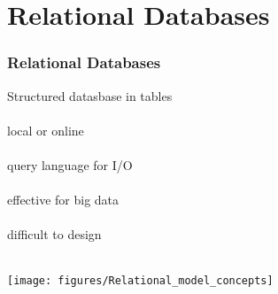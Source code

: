 \documentclass{beamer}
\begin{document}

\section{Relational Databases}

\begin{frame}
	\frametitle{Relational Databases}
	\begin{center}
		Structured datasbase in tables \\~\\
		local or online \\~\\
		query language for I/O \\~\\
		effective for big data \\~\\
		difficult to design \\~\\
	\end{center}
\end{frame}

\begin{frame}
	\begin{center}
		\texttt{[image: figures/Relational\_model\_concepts]}
	\end{center}
\end{frame}
\end{document}
